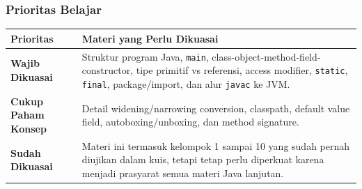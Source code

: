\subsubsection{Prioritas Belajar}

\begin{tabularx}{\textwidth}{|L{0.22\textwidth}|X|}
\hline
\textbf{Prioritas} & \textbf{Materi yang Perlu Dikuasai} \\
\hline
\textbf{Wajib Dikuasai} & Struktur program Java, \texttt{main}, class-object-method-field-constructor, tipe primitif vs referensi, access modifier, \texttt{static}, \texttt{final}, package/import, dan alur \texttt{javac} ke JVM. \\
\hline
\textbf{Cukup Paham Konsep} & Detail widening/narrowing conversion, classpath, default value field, autoboxing/unboxing, dan method signature. \\
\hline
\textbf{Sudah Dikuasai} & Materi ini termasuk kelompok 1 sampai 10 yang sudah pernah diujikan dalam kuis, tetapi tetap perlu diperkuat karena menjadi prasyarat semua materi Java lanjutan. \\
\hline
\end{tabularx}
